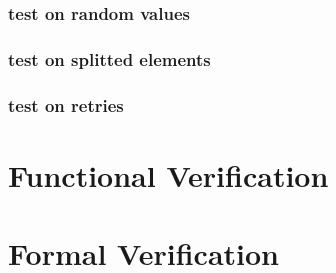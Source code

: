 \subsubsection{test on random values}

\subsubsection{test on splitted elements}

\subsubsection{test on retries}

\section{Functional Verification}

\section{Formal Verification}

